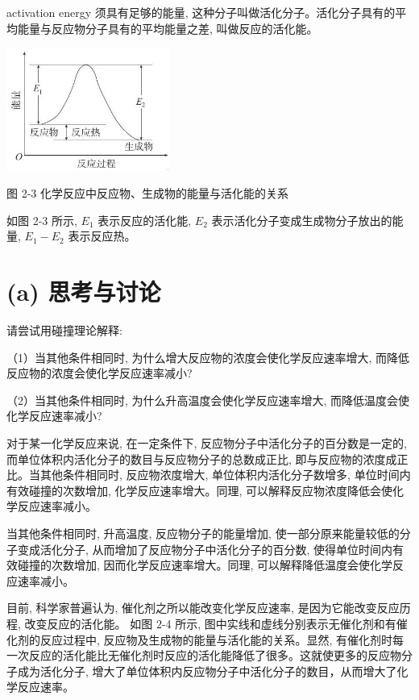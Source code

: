 \documentclass[10pt]{article}
\begin{document}
activation energy 须具有足够的能量, 这种分子叫做活化分子。活化分子具有的平均能量与反应物分子具有的平均能量之差, 叫做反应的活化能。

\begin{center}
\includegraphics[max width=0.4\textwidth]{images/0190da9d-8bfd-732f-bc2c-0b21d0f13b91_33_675881.jpg}
\end{center}

图 2-3 化学反应中反应物、生成物的能量与活化能的关系

如图 2-3 所示, \({E}_{1}\) 表示反应的活化能, \({E}_{2}\) 表示活化分子变成生成物分子放出的能量, \({E}_{1} - {E}_{2}\) 表示反应热。

\section*{(a) 思考与讨论}

请尝试用碰撞理论解释:

（1）当其他条件相同时, 为什么增大反应物的浓度会使化学反应速率增大, 而降低反应物的浓度会使化学反应速率减小?

（2）当其他条件相同时, 为什么升高温度会使化学反应速率增大, 而降低温度会使化学反应速率减小?

对于某一化学反应来说, 在一定条件下, 反应物分子中活化分子的百分数是一定的, 而单位体积内活化分子的数目与反应物分子的总数成正比, 即与反应物的浓度成正比。当其他条件相同时, 反应物浓度增大, 单位体积内活化分子数增多, 单位时间内有效碰撞的次数增加, 化学反应速率增大。同理, 可以解释反应物浓度降低会使化学反应速率减小。

当其他条件相同时, 升高温度, 反应物分子的能量增加, 使一部分原来能量较低的分子变成活化分子, 从而增加了反应物分子中活化分子的百分数, 使得单位时间内有效碰撞的次数增加, 因而化学反应速率增大。同理, 可以解释降低温度会使化学反应速率减小。

目前, 科学家普遍认为, 催化剂之所以能改变化学反应速率, 是因为它能改变反应历程, 改变反应的活化能。 如图 2-4 所示, 图中实线和虚线分别表示无催化剂和有催化剂的反应过程中, 反应物及生成物的能量与活化能的关系。显然, 有催化剂时每一次反应的活化能比无催化剂时反应的活化能降低了很多。这就使更多的反应物分子成为活化分子, 增大了单位体积内反应物分子中活化分子的数目，从而增大了化学反应速率。
\end{document}
